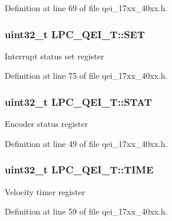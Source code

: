 Definition at line 69 of file qei\+\_\+17xx\+\_\+40xx.\+h.

\subsubsection[{\texorpdfstring{S\+ET}{SET}}]{ uint32\+\_\+t L\+P\+C\+\_\+\+Q\+E\+I\+\_\+\+T\+::\+S\+ET}\hypertarget{structLPC__QEI__T_a199af3383881188039525c15e18049a9}{}\label{structLPC__QEI__T_a199af3383881188039525c15e18049a9}
Interrupt status set register 

Definition at line 75 of file qei\+\_\+17xx\+\_\+40xx.\+h.

\subsubsection[{\texorpdfstring{S\+T\+AT}{STAT}}]{ uint32\+\_\+t L\+P\+C\+\_\+\+Q\+E\+I\+\_\+\+T\+::\+S\+T\+AT}\hypertarget{structLPC__QEI__T_a842c67512c5c8c9a31e7ba2ec4771784}{}\label{structLPC__QEI__T_a842c67512c5c8c9a31e7ba2ec4771784}
Encoder status register 

Definition at line 49 of file qei\+\_\+17xx\+\_\+40xx.\+h.

\subsubsection[{\texorpdfstring{T\+I\+ME}{TIME}}]{ uint32\+\_\+t L\+P\+C\+\_\+\+Q\+E\+I\+\_\+\+T\+::\+T\+I\+ME}\hypertarget{structLPC__QEI__T_a73a528b77fc560d229dc287237a9879e}{}\label{structLPC__QEI__T_a73a528b77fc560d229dc287237a9879e}
Velocity timer register 

Definition at line 59 of file qei\+\_\+17xx\+\_\+40xx.\+h.

